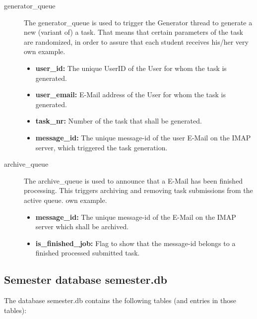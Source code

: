 \begin{description}
\item [generator\_queue] The generator\_queue is used to trigger the Generator thread
	to generate a new (variant of) a task. That means that certain parameters of the
	task are randomized, in order to assure that each student receives his/her very
	own example.
	\begin{itemize}
        \item {\bf user\_id:} The unique UserID of the User for whom the task is generated.
        \item {\bf user\_email:} E-Mail address of the User for whom the task is generated.
        \item {\bf task\_nr:} Number of the task that shall be generated.
        \item {\bf message\_id:} The unique message-id of the user E-Mail on the IMAP server,
			which triggered the task generation.
    \end{itemize}

\item [archive\_queue] The archive\_queue is used to announce that a E-Mail has been finished
	processing. This triggers archiving and removing task submissions from the active queue.
	own example.
	\begin{itemize}
        \item {\bf message\_id:} The unique message-id of the E-Mail on the IMAP server which shall
			be archived.
        \item {\bf is\_finished\_job:} Flag to show that the message-id belongs to a finished
			processed submitted task.
    \end{itemize}
\end{description}

\subsection{Semester database semester.db} \label{app:semester.db}

The database semester.db contains the following tables (and entries in those tables):

